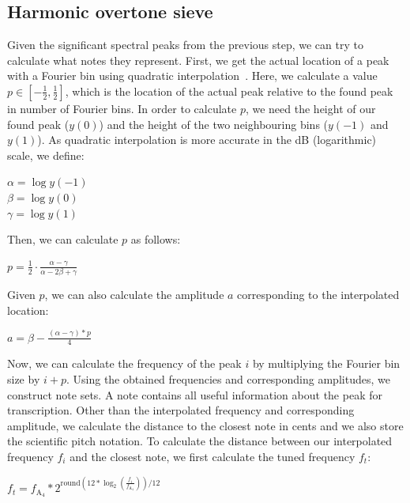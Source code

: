 \documentclass[10pt,twocolumn]{article}
\begin{document}
\subsection{Harmonic overtone sieve}  \label{sec:noteset_intro}
Given the significant spectral peaks from the previous step, we can try to calculate what notes they represent. First, we get the actual location of a peak with a Fourier bin using quadratic interpolation~\cite{interpol}\cite{interpol2}. Here, we calculate a value $p \in [-\frac{1}{2}, \frac{1}{2}]$, which is the location of the actual peak relative to the found peak in number of Fourier bins. In order to calculate $p$, we need the height of our found peak ($y(0)$) and the height of the two neighbouring bins ($y(-1)$ and $y(1)$). As quadratic interpolation is more accurate in the dB (logarithmic) scale, we define:
\begin{center}%
    $\alpha = \log y(-1)$\\
    $\beta = \log y(0)$\\
    $\gamma = \log y(1)$
\end{center}%
Then, we can calculate $p$ as follows:
\begin{center}%
    $p = \frac{1}{2} \cdot \frac{\alpha - \gamma}{\alpha - 2\beta + \gamma}$
\end{center}%
Given $p$, we can also calculate the amplitude $a$ corresponding to the interpolated location:
\begin{center}
    $a = \beta - \frac{(\alpha - \gamma) * p}{4}$
\end{center}
Now, we can calculate the frequency of the peak $i$ by multiplying the Fourier bin size by $i + p$. Using the obtained frequencies and corresponding amplitudes, we construct note sets. A note contains all useful information about the peak for transcription. Other than the interpolated frequency and corresponding amplitude, we calculate the distance to the closest note in cents and we also store the scientific pitch notation. To calculate the distance between our interpolated frequency $f_i$ and the closest note, we first calculate the tuned frequency $f_t$:
\begin{center}
    $f_t = f_{\text{A}_4} * 2^{\text{round}(12 * \log_2(\frac{f_i}{f_{\text{A}_4}})) / 12}$  %
\end{center}
\end{document}
